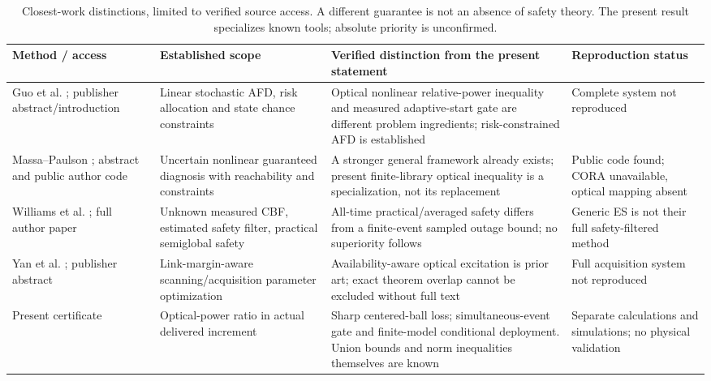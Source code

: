 \begin{table}[t]
\caption{Closest-work distinctions, limited to verified source access. A different guarantee is not an absence of safety theory. The present result specializes known tools; absolute priority is unconfirmed.}
\centering\footnotesize
\begin{tabular}{@{}p{}p{}p{}p{}@{}}\toprule
Method / access & Established scope & Verified distinction from the present statement & Reproduction status\\\midrule
Guo et al. \cite{guo}; publisher abstract/introduction & Linear stochastic AFD, risk allocation and state chance constraints & Optical nonlinear relative-power inequality and measured adaptive-start gate are different problem ingredients; risk-constrained AFD is established & Complete system not reproduced\\
Massa--Paulson \cite{massa}; abstract and public author code \cite{massacode} & Uncertain nonlinear guaranteed diagnosis with reachability and constraints & A stronger general framework already exists; present finite-library optical inequality is a specialization, not its replacement & Public code found; CORA unavailable, optical mapping absent\\
Williams et al. \cite{safees}; full author paper & Unknown measured CBF, estimated safety filter, practical semiglobal safety & All-time practical/averaged safety differs from a finite-event sampled outage bound; no superiority follows & Generic ES is not their full safety-filtered method\\
Yan et al. \cite{yan}; publisher abstract & Link-margin-aware scanning/acquisition parameter optimization & Availability-aware optical excitation is prior art; exact theorem overlap cannot be excluded without full text & Full acquisition system not reproduced\\
Present certificate & Optical-power ratio in actual delivered increment & Sharp centered-ball loss; simultaneous-event gate and finite-model conditional deployment. Union bounds and norm inequalities themselves are known & Separate calculations and simulations; no physical validation\\\bottomrule
\end{tabular}
\label{tab:closest}
\end{table}
